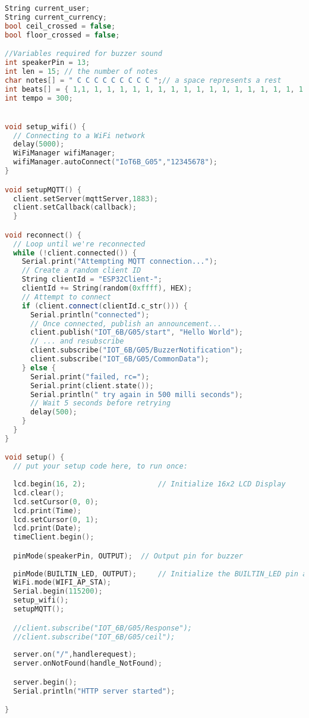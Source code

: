 \begin{lstlisting}[language=C++]
String current_user;
String current_currency;
bool ceil_crossed = false;
bool floor_crossed = false;

//Variables required for buzzer sound
int speakerPin = 13;
int len = 15; // the number of notes
char notes[] = " C C C C C C C C C ";// a space represents a rest
int beats[] = { 1,1, 1, 1, 1, 1, 1, 1, 1, 1, 1, 1, 1, 1, 1, 1, 1, 1, 1 };
int tempo = 300;


void setup_wifi() {
  // Connecting to a WiFi network
  delay(5000);
  WiFiManager wifiManager; 
  wifiManager.autoConnect("IoT6B_G05","12345678");
}

void setupMQTT() {
  client.setServer(mqttServer,1883);
  client.setCallback(callback);
  }

void reconnect() {
  // Loop until we're reconnected
  while (!client.connected()) {
    Serial.print("Attempting MQTT connection...");
    // Create a random client ID
    String clientId = "ESP32Client-";
    clientId += String(random(0xffff), HEX);
    // Attempt to connect
    if (client.connect(clientId.c_str())) {
      Serial.println("connected");
      // Once connected, publish an announcement...
      client.publish("IOT_6B/G05/start", "Hello World");
      // ... and resubscribe
      client.subscribe("IOT_6B/G05/BuzzerNotification");
      client.subscribe("IOT_6B/G05/CommonData");
    } else {
      Serial.print("failed, rc=");
      Serial.print(client.state());
      Serial.println(" try again in 500 milli seconds");
      // Wait 5 seconds before retrying
      delay(500);
    }
  }
}

void setup() {
  // put your setup code here, to run once:
  
  lcd.begin(16, 2);                 // Initialize 16x2 LCD Display
  lcd.clear();
  lcd.setCursor(0, 0);
  lcd.print(Time);
  lcd.setCursor(0, 1);
  lcd.print(Date);
  timeClient.begin();

  pinMode(speakerPin, OUTPUT);  // Output pin for buzzer
  
  pinMode(BUILTIN_LED, OUTPUT);     // Initialize the BUILTIN_LED pin as an output
  WiFi.mode(WIFI_AP_STA);
  Serial.begin(115200);
  setup_wifi();
  setupMQTT();

  //client.subscribe("IOT_6B/G05/Response");
  //client.subscribe("IOT_6B/G05/ceil");
  
  server.on("/",handlerequest);
  server.onNotFound(handle_NotFound);

  server.begin();
  Serial.println("HTTP server started");

}


\end{lstlisting}
